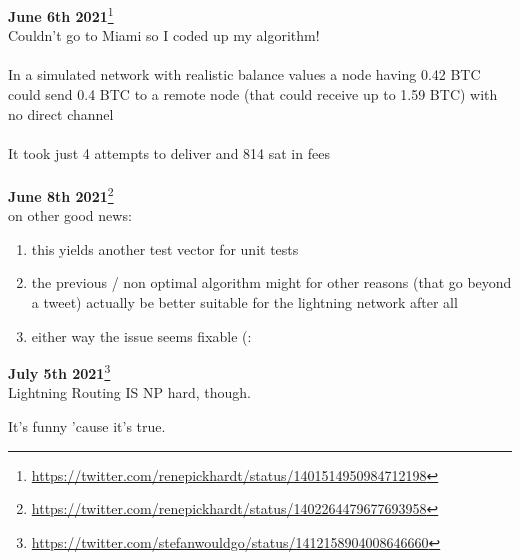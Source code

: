 \documentclass[10pt,twocolumn]{article}
\begin{document}
\begin{appendix}
\textbf{June 6th 2021}\footnote{\url{https://twitter.com/renepickhardt/status/1401514950984712198}}\\
Couldn't go to Miami so I coded up my algorithm!\\\\
In a simulated network with realistic balance values a node having 0.42 BTC could send 0.4 BTC to a remote node (that could receive up to 1.59 BTC) with no direct channel\\\\
It took just 4 attempts to deliver and 814 sat in fees\\\\

\textbf{June 8th 2021}\footnote{\url{https://twitter.com/renepickhardt/status/1402264479677693958}}\\
on other good news:
\begin{enumerate}
\item this yields another test vector for unit tests
\item the previous / non optimal algorithm might for other reasons (that go beyond a tweet) actually be better suitable for the lightning network after all
\item either way the issue seems fixable (:
\end{enumerate}

  \textbf{July 5th 2021}\footnote{\url{https://twitter.com/stefanwouldgo/status/1412158904008646660}}\\
  Lightning Routing IS NP hard, though.

  It's funny 'cause it's true.



\end{appendix}
\end{document}
